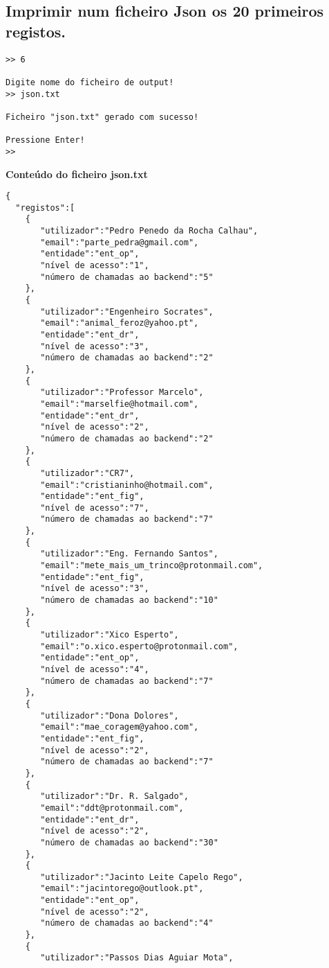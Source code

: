 \documentclass[11pt,a4paper]{report}%
\begin{document}
\subsection{Imprimir num ficheiro Json os 20 primeiros registos.}

\begin{verbatim}
>> 6

Digite nome do ficheiro de output!
>> json.txt

Ficheiro "json.txt" gerado com sucesso!

Pressione Enter!
>> 
\end{verbatim}

\textbf{Conteúdo do ficheiro json.txt}

\begin{verbatim}
{
  "registos":[
    {
       "utilizador":"Pedro Penedo da Rocha Calhau",
       "email":"parte_pedra@gmail.com",
       "entidade":"ent_op",
       "nível de acesso":"1",
       "número de chamadas ao backend":"5"
    },
    {
       "utilizador":"Engenheiro Socrates",
       "email":"animal_feroz@yahoo.pt",
       "entidade":"ent_dr",
       "nível de acesso":"3",
       "número de chamadas ao backend":"2"
    },
    {
       "utilizador":"Professor Marcelo",
       "email":"marselfie@hotmail.com",
       "entidade":"ent_dr",
       "nível de acesso":"2",
       "número de chamadas ao backend":"2"
    },
    {
       "utilizador":"CR7",
       "email":"cristianinho@hotmail.com",
       "entidade":"ent_fig",
       "nível de acesso":"7",
       "número de chamadas ao backend":"7"
    },
    {
       "utilizador":"Eng. Fernando Santos",
       "email":"mete_mais_um_trinco@protonmail.com",
       "entidade":"ent_fig",
       "nível de acesso":"3",
       "número de chamadas ao backend":"10"
    },
    {
       "utilizador":"Xico Esperto",
       "email":"o.xico.esperto@protonmail.com",
       "entidade":"ent_op",
       "nível de acesso":"4",
       "número de chamadas ao backend":"7"
    },
    {
       "utilizador":"Dona Dolores",
       "email":"mae_coragem@yahoo.com",
       "entidade":"ent_fig",
       "nível de acesso":"2",
       "número de chamadas ao backend":"7"
    },
    {
       "utilizador":"Dr. R. Salgado",
       "email":"ddt@protonmail.com",
       "entidade":"ent_dr",
       "nível de acesso":"2",
       "número de chamadas ao backend":"30"
    },
    {
       "utilizador":"Jacinto Leite Capelo Rego",
       "email":"jacintorego@outlook.pt",
       "entidade":"ent_op",
       "nível de acesso":"2",
       "número de chamadas ao backend":"4"
    },
    {
       "utilizador":"Passos Dias Aguiar Mota",

\end{verbatim}
\end{document}
